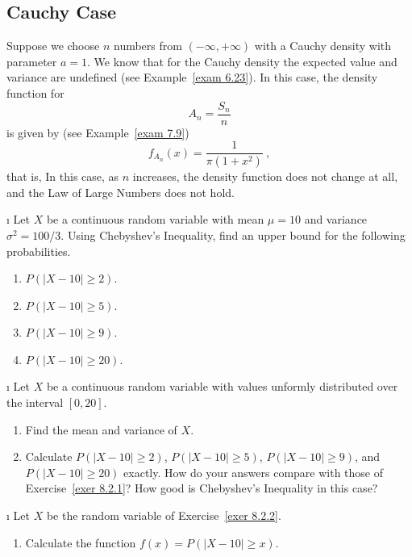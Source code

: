 {\subsection*{Cauchy Case}
\begin{example}\label{exam 8.2.5}
Suppose we choose $n$ numbers from $(-\infty,+\infty)$ with a Cauchy density
with parameter $a = 1$.  We know that for the Cauchy density the expected value
and variance are undefined (see Example~\ref{exam 6.23}).  In this case, the
density function for
$$
A_n = \frac {S_n}n
$$
is given by (see Example~\ref{exam 7.9})
$$
f_{A_n}(x) = \frac 1{\pi(1 + x^2)}\ ,
$$
that is,   In this
case, as $n$ increases, the density function does not change at all, and the
Law of Large Numbers does not hold.
\end{example}

\exercises
\begin{LJSItem}

\i\label{exer 8.2.1} Let $X$ be a continuous random variable with mean $\mu =
10$ and variance $\sigma^2 = 100/3$.  Using Chebyshev's Inequality, find an upper
bound for the following probabilities.
\begin{enumerate}
\item $P(|X - 10| \geq 2)$.

\item $P(|X - 10| \geq 5)$.

\item $P(|X - 10| \geq 9)$.

\item $P(|X - 10| \geq 20)$.
\end{enumerate}

\i\label{exer 8.2.2} Let $X$ be a continuous random variable with values
unformly distributed over the interval $[0,20]$.
\begin{enumerate}
\item Find the mean and variance of $X$.

\item Calculate $P(|X - 10| \geq 2)$, $P(|X - 10| \geq 5)$, $P(|X - 10| \geq
9)$, and $P(|X - 10| \geq 20)$ exactly.  How do your answers compare with those
of Exercise~\ref{exer 8.2.1}?  How good is Chebyshev's Inequality in this case?
\end{enumerate}

\i\label{exer 8.2.3} Let $X$ be the random variable of Exercise~\ref{exer
8.2.2}.
\begin{enumerate}
\item Calculate the function $f(x) = P(|X - 10| \geq x)$.


\end{enumerate}
\end{LJSItem}}
